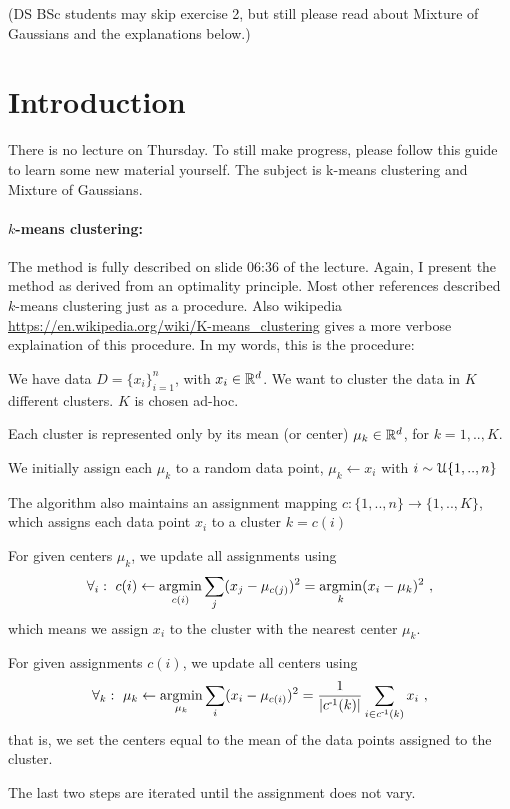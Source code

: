 

\renewcommand{\course}{Machine Learning}
\renewcommand{\exnum}{9}

\exercises

(DS BSc students may skip exercise 2, but still please read about Mixture of Gaussians and the explanations below.)


\section*{Introduction}

There is no lecture on Thursday. To still make progress, please follow this guide to learn some new material yourself. The subject is k-means clustering and Mixture of Gaussians.

\paragraph{$k$-means clustering:} The method is fully described on slide 06:36 of the lecture. Again, I
present the method as derived from an optimality principle. Most other
references described $k$-means clustering just as a procedure. Also
wikipedia \url{https://en.wikipedia.org/wiki/K-means_clustering} gives
a more verbose explaination of this procedure. In my words, this is
the procedure:
\begin{items}
\item We have data $D=\{x_i\}_{i=1}^n$, with $x_i\in{\mathbb{R}}^d$. We want to cluster the data in $K$ different clusters. $K$ is chosen ad-hoc.
\item Each cluster is represented only by its mean (or center) $\mu_k\in{\mathbb{R}}^d$, for $k=1,..,K$.
\item We initially assign each $\mu_k$ to a random data point, $\mu_k \gets x_i$ with $i \sim{\cal U}\{1,..,n\}$
\item The algorithm also maintains an assignment mapping $c: \{1,..,n\} \to \{1,..,K\}$, which assigns each data point $x_i$ to a cluster $k=c(i)$
\item For given centers $\mu_k$, we update all assignments using
$$\forall_i:~ c(i) \gets \operatorname*{argmin}_{c(i)} \sum_j (x_j - \mu_{c(j)})^2 = \operatorname*{argmin}_k (x_i-\mu_k)^2 ~,$$
which means we assign $x_i$ to the cluster with the nearest center $\mu_k$.
\item For given assignments $c(i)$, we update all centers using
$$\forall_k:~ \mu_k \gets \operatorname*{argmin}_{\mu_k} \sum_i (x_i-\mu_{c(i)})^2 =  \frac{1}{|c^{{\hspace*{-.0pt}\text{\rm -}\hspace*{-.5pt}}1}(k)|} \sum_{i\in c^{{\hspace*{-.0pt}\text{\rm -}\hspace*{-.5pt}}1}(k)} x_i ~,$$
that is, we set the centers equal to the mean of the data points assigned to the cluster.
\item The last two steps are iterated until the assignment does not vary.
\end{items}

